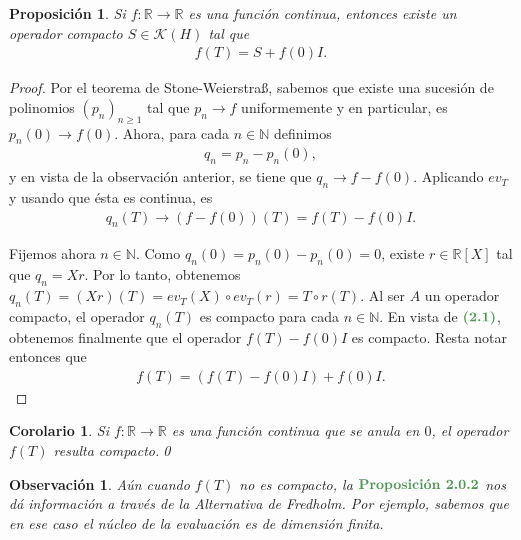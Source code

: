 \documentclass[11pt]{report}
\theoremstyle{colored}
\newtheorem{proposition}{Proposición}[section]
\newtheorem{corollary}{Corolario}[section]
\newtheorem{remark}{Observación}[section]
\newcommand{\N}{\mathbb{N}}
\newcommand{\R}{\mathbb{R}}
\newcommand{\paint}[1]{\color{color}{#1}}
\newcommand{\tpaint}[1]{\paint{\textbf{#1}}}
\begin{document}
\begin{proposition} Si $f : \R \to \R$ es una función continua, entonces existe un operador compacto $S \in \mathscr{K}(H)$ tal que
\begin{align*}
f(T) = S + f(0)I.
\end{align*}
\end{proposition}
\begin{proof} Por el teorema de Stone-Weierstraß, sabemos que existe una sucesión de polinomios $(p_n)_{n \geq 1}$ tal que $p_n \to f$ uniformemente y en particular, es $p_n(0) \to f(0)$. Ahora, para cada $n \in \N$ definimos
\begin{align*}
q_n = p_n - p_n(0),
\end{align*} 
y en vista de la observación anterior, se tiene que $q_n \to f - f(0)$. Aplicando $ev_T$ y usando que ésta es continua, es
\begin{align}
q_n(T) \to (f-f(0))(T) = f(T) - f(0)I.
\end{align}

Fijemos ahora $n \in \N$. Como $q_n(0) = p_n(0) - p_n(0) = 0$, existe $r \in \R[X]$ tal que $q_n = Xr$. Por lo tanto, obtenemos $q_n(T) = (Xr)(T) = ev_T(X) \circ ev_T(r) = T \circ r(T)$. Al ser $A$ un operador compacto, el operador $q_n(T)$ es compacto para cada $n \in \N$. En vista de $\tpaint{(2.1)}$, obtenemos finalmente que el operador $f(T) - f(0)I$ es compacto. Resta notar entonces que
\begin{align*}
f(T) = (f(T)-f(0)I) + f(0)I.
\end{align*}  
\end{proof}

\begin{corollary} Si $f : \R \to \R$ es una función continua que se anula en $0$, el operador $f(T)$ resulta compacto.\qed
\end{corollary}

\begin{remark} Aún cuando $f(T)$ no es compacto, la $\tpaint{Proposición 2.0.2}$ nos dá información a través de la Alternativa de Fredholm. Por ejemplo, sabemos que en ese caso el núcleo de la evaluación es de dimensión finita.
\end{remark}
\end{document}

